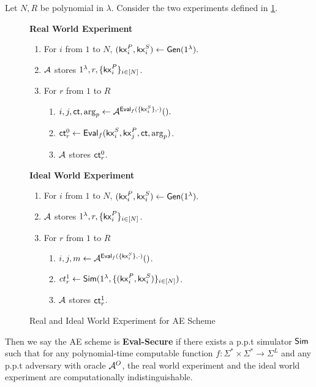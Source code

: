 \begin{definition}
\label{defn:AE-eval-security}
Let $N, R$ be polynomial in $\lambda$. Consider the two experiments defined in \cref{expr:AE-real-ideal-world}.

\begin{figure}[h!]
\begin{framed}
\textbf{Real World Experiment}
\begin{enumerate}
    \item For $i$ from $1$ to $N$, $(\mathsf{kx}_i^P, \mathsf{kx}_i^S) \leftarrow \mathsf{Gen}(1^{\lambda}).$
    \item $\mathcal{A}$ stores $1^{\lambda}, r, \{\mathsf{kx}_i^P\}_{i \in [N]}$.
    \item For $r$ from $1$ to $R$
    \begin{enumerate}
        \item $i, j, \mathsf{ct}, \arg_p \leftarrow \mathcal{A}^{\mathsf{Eval}_f(\{\mathsf{kx}_i^S\}, \cdot)}().$
        \item $\mathsf{ct}^{0}_r \leftarrow \mathsf{Eval}_f(\mathsf{kx}_i^S, \mathsf{kx}_j^P, \mathsf{ct}, \arg_p)$.
        \item $\mathcal{A}$ stores $\mathsf{ct}^{0}_r$.
    \end{enumerate}
\end{enumerate}
\textbf{Ideal World Experiment}
\begin{enumerate}
    \item For $i$ from $1$ to $N$, $(\mathsf{kx}_i^P, \mathsf{kx}_i^S) \leftarrow \mathsf{Gen}(1^{\lambda}).$
    \item $\mathcal{A}$ stores $1^{\lambda}, r, \{\mathsf{kx}_i^P\}_{i \in [N]}$.
    \item For $r$ from $1$ to $R$
    \begin{enumerate}
        \item $i, j, m \leftarrow \mathcal{A}^{\mathsf{Eval}_f(\{\mathsf{kx}_i^S\}, \cdot)}()$.
        \item $ct^1_r \leftarrow \mathsf{Sim}(1^{\lambda}, \{(\mathsf{kx}_i^P, \mathsf{kx}_i^S)\}_{i \in [N]})$.
        \item $\mathcal{A}$ stores $\mathsf{ct}^{1}_r$.
    \end{enumerate}
\end{enumerate}
\end{framed}
\caption{Real and Ideal World Experiment for AE Scheme}
\label{expr:AE-real-ideal-world}
\end{figure}

Then we say the AE scheme is \textbf{Eval-Secure} if there exists a p.p.t simulator $\mathsf{Sim}$ such that for any polynomial-time computable function $f: \Sigma^* \times \Sigma^* \to \Sigma^{L}$ and any p.p.t adversary with oracle $\mathcal{A}^O$, the real world experiment and the ideal world experiment are computationally indistinguishable.
\end{definition}

